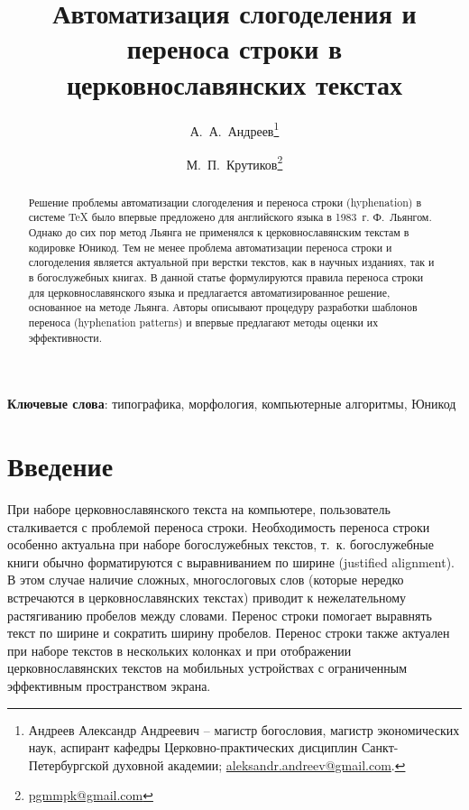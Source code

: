 \documentclass[12pt,a4paper,oneside]{extarticle}
\title{Автоматизация слогоделения и переноса строки в церковнославянских текстах}
\author{А.~А.~Андреев\thanks{Андреев Александр Андреевич -- магистр богословия, магистр экономических наук, аспирант кафедры Церковно-практических дисциплин Санкт-Петербургской духовной академии; \url{aleksandr.andreev@gmail.com}.} \and М.~П.~Крутиков\thanks{\url{pgmmpk@gmail.com}}}
\date{\vspace{-1em}}  %
\providecommand{\keywords}[1]{\textbf{Ключевые слова}: #1}
\begin{document}
\maketitle

\begin{abstract}
Решение проблемы автоматизации слогоделения и переноса строки
(\textenglish{hyphenation}) в системе \TeX{} было впервые предложено для английского языка в 1983~г.
Ф.~Льянгом. Однако до сих пор метод Льянга не применялся к
церковнославянским текстам в кодировке Юникод. Тем не менее проблема
автоматизации переноса строки и слогоделения является актуальной при
верстки текстов, как в научных изданиях, так и в богослужебных книгах. В данной статье
формулируются правила переноса строки для церковнославянского языка и
предлагается автоматизированное решение, основанное на методе Льянга.
Авторы описывают процедуру разработки шаблонов переноса (\textenglish{hyphenation patterns})
и впервые предлагают методы оценки их эффективности.
\end{abstract}

\keywords{типографика, морфология, компьютерные алгоритмы, Юникод}

\section{Введение}

При наборе церковнославянского текста на компьютере, пользователь сталкивается с проблемой переноса строки. Необходимость переноса строки особенно актуальна при наборе богослужебных текстов, т.~к. богослужебные книги обычно форматируются с выравниванием по ширине (\textenglish{justified alignment}). В этом случае наличие сложных, многослоговых слов (которые нередко встречаются в церковнославянских текстах) приводит к нежелательному растягиванию пробелов между словами. Перенос строки помогает выравнять текст по ширине и сократить ширину пробелов. Перенос строки также актуален при наборе текстов в нескольких колонках и при отображении церковнославянских текстов на мобильных устройствах с ограниченным эффективным пространством экрана.
\end{document}
